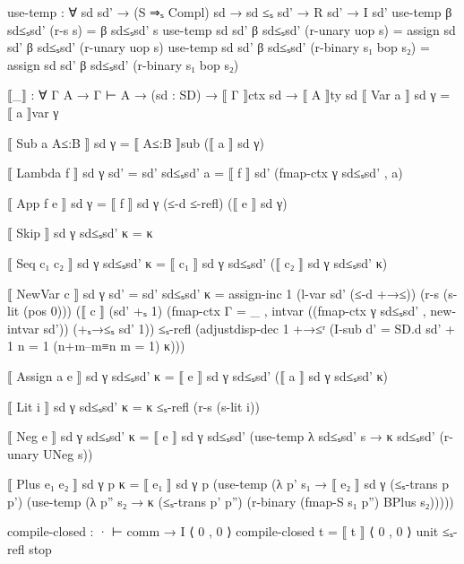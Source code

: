 \documentclass{article}
\begin{document}
\begin{prev}
\begin{code}
use-temp : ∀ {sd sd'} → (S ⇒ₛ Compl) sd → sd ≤ₛ sd' → R sd' → I sd'
use-temp β sd≤ₛsd' (r-s s) = β sd≤ₛsd' s
use-temp {sd} {sd'} β sd≤ₛsd' (r-unary uop s) = 
    assign sd sd' β sd≤ₛsd' (r-unary uop s)
use-temp {sd} {sd'} β sd≤ₛsd' (r-binary s₁ bop s₂) = 
    assign sd sd' β sd≤ₛsd' (r-binary s₁ bop s₂)


⟦_⟧ : ∀ {Γ A} → Γ ⊢ A → (sd : SD) → ⟦ Γ ⟧ctx sd → ⟦ A ⟧ty sd
⟦ Var a ⟧ sd γ = ⟦ a ⟧var γ

⟦ Sub a A≤:B ⟧ sd γ = ⟦ A≤:B ⟧sub (⟦ a ⟧ sd γ)

⟦ Lambda f ⟧ sd γ {sd' = sd'} sd≤ₛsd' a 
    = ⟦ f ⟧ sd' (fmap-ctx γ sd≤ₛsd' , a)

⟦ App f e ⟧ sd γ = ⟦ f ⟧ sd γ (≤-d ≤-refl) (⟦ e ⟧ sd γ)

⟦ Skip ⟧ sd γ sd≤ₛsd' κ = κ

⟦ Seq c₁ c₂ ⟧ sd γ sd≤ₛsd' κ 
    = ⟦ c₁ ⟧ sd γ sd≤ₛsd' (⟦ c₂ ⟧ sd γ sd≤ₛsd' κ)

⟦ NewVar c ⟧ sd γ {sd' = sd'} sd≤ₛsd' κ = 
    assign-inc 
        1 
        (l-var sd' (≤-d +→≤)) 
        (r-s (s-lit (pos 0))) 
        (⟦ c ⟧ 
            (sd' +ₛ 1)
            (fmap-ctx {Γ = _ , intvar} 
                ((fmap-ctx γ sd≤ₛsd' , new-intvar sd')) 
                (+ₛ→≤ₛ {sd'} {1}))
            ≤ₛ-refl
            (adjustdisp-dec 
                1 
                +→≤ʳ 
                (I-sub {d' = SD.d sd' + 1} {n = 1} 
                    (n+m–m≡n {m = 1}) κ)))

⟦ Assign a e ⟧ sd γ sd≤ₛsd' κ = ⟦ e ⟧ sd γ sd≤ₛsd' (⟦ a ⟧ sd γ sd≤ₛsd' κ)

⟦ Lit i ⟧ sd γ sd≤ₛsd' κ = κ ≤ₛ-refl (r-s (s-lit i))

⟦ Neg e ⟧ sd γ sd≤ₛsd' κ = 
    ⟦ e ⟧ sd γ sd≤ₛsd' 
        (use-temp λ sd≤ₛsd' s → κ sd≤ₛsd' (r-unary UNeg s))
  
⟦ Plus e₁ e₂ ⟧ sd γ p κ = 
    ⟦ e₁ ⟧ sd γ p (use-temp (λ p' s₁ → ⟦ e₂ ⟧ sd γ (≤ₛ-trans p p') 
                    (use-temp (λ p'' s₂ →  κ (≤ₛ-trans p' p'') 
                        (r-binary (fmap-S s₁ p'') BPlus s₂)))))

compile-closed : · ⊢ comm → I ⟨ 0 , 0 ⟩
compile-closed t = ⟦ t ⟧ ⟨ 0 , 0 ⟩ unit ≤ₛ-refl stop
\end{code}
\end{prev}
\end{document}
